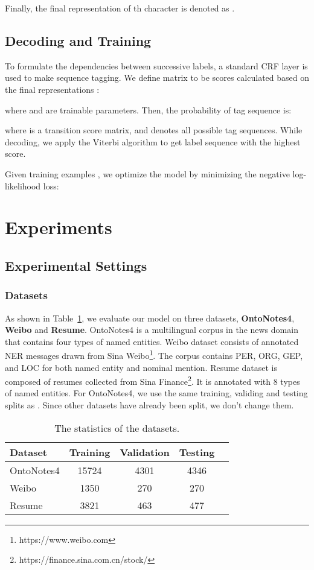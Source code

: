 \documentclass[conference]{IEEEtran}
\begin{document}
Finally, the final representation of th character is denoted as .

\subsection{Decoding and Training}
To formulate the dependencies between successive labels, a standard CRF layer
is used to make sequence tagging.
We define matrix  to be scores calculated based on the 
final representations : 

where  and  are trainable parameters.
Then, the probability of tag sequence  is:

where  is a transition score matrix,
and  denotes all possible tag sequences.
While decoding, we apply the Viterbi \cite{viterbi1967error} algorithm to get label sequence with the highest score.


Given training examples , we optimize the model by minimizing
the negative log-likelihood loss:





\section{Experiments}
\subsection{Experimental Settings}
\subsubsection{Datasets}
As shown in Table~\ref{datasets}, we evaluate our model on three datasets, \textbf{OntoNotes4}, \textbf{Weibo} and \textbf{Resume}. OntoNotes4 is a multilingual corpus in the news domain
 that contains four types of named entities. {Weibo} 
dataset consists of annotated NER messages drawn 
from Sina Weibo\footnote{https://www.weibo.com}.
The corpus contains PER, ORG, GEP, and LOC for both named entity and nominal mention. 
{Resume} dataset is composed of resumes collected from Sina Finance\footnote{https://finance.sina.com.cn/stock/}.
It is annotated with 8 types of named entities.
For OntoNotes4, we use the same training, validing and testing splits as \cite{DBLP:conf/naacl/CheWML13}. Since other datasets have already been split, we don't change them. 



\begin{table}[h]
    \caption{The statistics of the datasets.}\label{datasets}
\centering
    \begin{tabular}{|l|c|c|c|c|}
    \hline
    \textbf{Dataset} & \textbf{Training} & \textbf{Validation} & \textbf{Testing}
         \\
    \hline
    OntoNotes4& 15724& 4301& 4346     \\
Weibo & 1350  & 270       & 270  \\
Resume   & 3821      &  463        &             477             \\
\hline
    \end{tabular}
\end{table}
\end{document}
